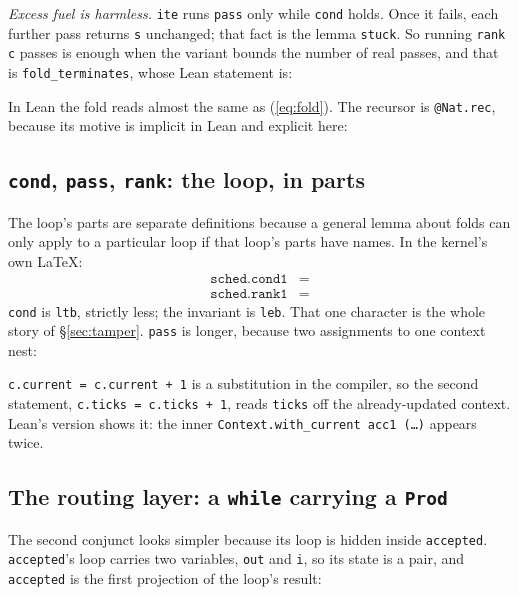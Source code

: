 \documentclass[11pt]{article}
\newcommand{\code}[1]{\texttt{#1}}
\begin{document}
\emph{Excess fuel is harmless.} \code{ite} runs \code{pass} only while
\code{cond} holds. Once it fails, each further pass returns \code{s}
unchanged; that fact is the lemma \code{stuck}. So running \code{rank c}
passes is enough when the variant bounds the number of real passes, and that
is \code{fold\_terminates}, whose Lean statement is:



In Lean the fold reads almost the same as (\ref{eq:fold}). The recursor
is \code{@Nat.rec}, because its motive is implicit in Lean and explicit here:



\subsection{\texorpdfstring{\code{cond}, \code{pass}, \code{rank}}{cond, pass, rank}: the loop, in parts}

The loop's parts are separate definitions because a general lemma about folds
can only apply to a particular loop if that loop's parts have names. In the
kernel's own \LaTeX{}:
\begin{align*}
\code{sched.cond1} &= \\
\code{sched.rank1} &= 
\end{align*}
\code{cond} is \code{ltb}, strictly less; the invariant is \code{leb}. That one
character is the whole story of \S\ref{sec:tamper}. \code{pass} is longer,
because two assignments to one context nest:



\code{c.current = c.current + 1} is a substitution in the compiler, so the
second statement, \code{c.ticks = c.ticks + 1}, reads \code{ticks} off the
already-updated context. Lean's version shows it: the inner
\code{Context.with\_current acc1 (\ldots)} appears twice.

\subsection{The routing layer: a \texorpdfstring{\code{while}}{while} carrying a \texorpdfstring{\code{Prod}}{Prod}}

The second conjunct looks simpler because its loop is hidden inside
\code{accepted}. \code{accepted}'s loop carries two variables, \code{out} and
\code{i}, so its state is a pair, and \code{accepted} is the first projection
of the loop's result:
\end{document}

